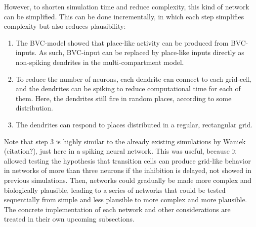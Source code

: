 \documentclass{article}
\begin{document}
    However, to shorten simulation time and reduce complexity, this kind of network can be simplified. This can be done incrementally, in which each step simplifies complexity but also reduces plausibility:
    \begin{enumerate}
        \item The BVC-model showed that place-like activity can be produced from BVC-inputs. As such, BVC-input can be replaced by place-like inputs directly as non-spiking dendrites in the multi-compartment model. 
        \item To reduce the number of neurons, each dendrite can connect to each grid-cell, and the dendrites can be spiking to reduce computational time for each of them. Here, the dendrites still fire in random places, according to some distribution.
        \item The dendrites can respond to places distributed in a regular, rectangular grid.
    \end{enumerate}
 
    Note that step 3 is highly similar to the already existing simulations by Waniek (citation?), just here in a spiking neural network. This was useful, because it allowed testing the hypothesis that transition cells can produce grid-like behavior in networks of more than three neurons if the inhibition is delayed, not showed in previous simulations. Then, networks could gradually be made more complex and biologically plausible, leading to a series of networks that could be tested sequentially from simple and less plausible to more complex and more plausible. The concrete implementation of each network and other considerations are treated in their own upcoming subsections.

 
\end{document}
